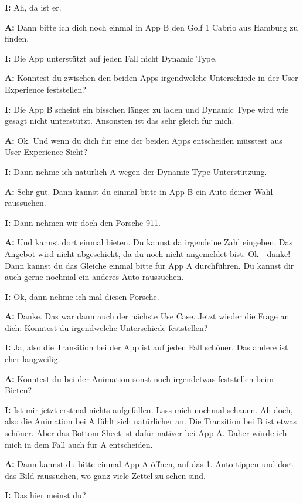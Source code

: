 \begin{myparindent}{0pt}
\textbf{I:} Ah, da ist er.

\textbf{A:} Dann bitte ich dich noch einmal in App B den Golf 1 Cabrio aus Hamburg zu finden. 

\textbf{I:} Die App unterstützt auf jeden Fall nicht Dynamic Type. 

\textbf{A:} Konntest du zwischen den beiden Apps irgendwelche Unterschiede in der User Experience feststellen?

\textbf{I:} Die App B scheint ein bisschen länger zu laden und Dynamic Type wird wie gesagt nicht unterstützt. Ansonsten ist das sehr gleich für mich. 

\textbf{A:} Ok. Und wenn du dich für eine der beiden Apps entscheiden müsstest aus User Experience Sicht?

\textbf{I:} Dann nehme ich natürlich A wegen der Dynamic Type Unterstützung. 

\textbf{A:} Sehr gut. Dann kannst du einmal bitte in App B ein Auto deiner Wahl raussuchen. 

\textbf{I:} Dann nehmen wir doch den Porsche 911.

\textbf{A:} Und kannst dort einmal bieten. Du kannst da irgendeine Zahl eingeben. Das Angebot wird nicht abgeschickt, da du noch nicht angemeldet bist. Ok - danke! 
Dann kannst du das Gleiche einmal bitte für App A durchführen. Du kannst dir auch gerne nochmal ein anderes Auto raussuchen. 

\textbf{I:} Ok, dann nehme ich mal diesen Porsche. 

\textbf{A:} Danke. Das war dann auch der nächste Use Case. Jetzt wieder die Frage an dich: Konntest du irgendwelche Unterschiede feststellen?

\textbf{I:} Ja, also die Transition bei der App ist auf jeden Fall schöner. Das andere ist eher langweilig.

\textbf{A:} Konntest du bei der Animation sonst noch irgendetwas feststellen beim Bieten?

\textbf{I:} Ist mir jetzt erstmal nichts aufgefallen. Lass mich nochmal schauen. Ah doch, also die Animation bei A fühlt sich natürlicher an. Die Transition bei B ist etwas schöner. Aber das Bottom Sheet ist dafür nativer bei App A. Daher würde ich mich in dem Fall auch für A entscheiden. 

\textbf{A:} Dann kannst du bitte einmal App A öffnen, auf das 1. Auto tippen und dort das Bild raussuchen, wo ganz viele Zettel zu sehen sind. 

\textbf{I:} Das hier meinst du?


\end{myparindent}
